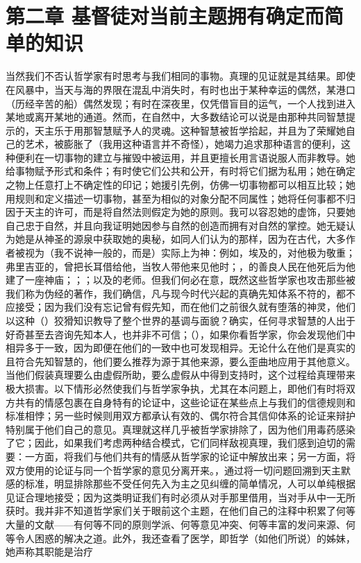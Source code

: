 
\section{第二章 基督徒对当前主题拥有确定而简单的知识}

当然我们不否认哲学家有时思考与我们相同的事物。真理的见证就是其结果。即使在风暴中，当天与海的界限在混乱中消失时，有时也出于某种幸运的偶然，某港口（历经辛苦的船）偶然发现；有时在深夜里，仅凭借盲目的运气，一个人找到进入某地或离开某地的通道。然而，在自然中，大多数结论可以说是由那种共同智慧提示的，天主乐于用那智慧赋予人的灵魂。这种智慧被哲学拾起，并且为了荣耀她自己的艺术，被膨胀了（我用这种语言并不奇怪），她竭力追求那种语言的便利，这种便利在一切事物的建立与摧毁中被运用，并且更擅长用言语说服人而非教导。她给事物赋予形式和条件；有时使它们公共和公开，有时将它们据为私用；她在确定之物上任意打上不确定性的印记；她援引先例，仿佛一切事物都可以相互比较；她用规则和定义描述一切事物，甚至为相似的对象分配不同属性；她将任何事都不归因于天主的许可，而是将自然法则假定为她的原则。我可以容忍她的虚饰，只要她自己忠于自然，并且向我证明她因参与自然的创造而拥有对自然的掌控。她无疑认为她是从神圣的源泉中获取她的奥秘，如同人们认为的那样，因为在古代，大多作者被视为（我不说神一般的，而是）实际上为神：例如，埃及的，对他极为敬重；弗里吉亚的，曾把长耳借给他，当牧人带他来见他时；，的善良人民在他死后为他建了一座神庙；；；以及的老师。但我们何必在意，既然这些哲学家也攻击那些被我们称为伪经的著作，我们确信，凡与现今时代兴起的真确先知体系不符的，都不应接受；因为我们没有忘记曾有假先知，而在他们之前很久就有堕落的神灵，他们以这种（）狡猾知识教导了整个世界的基调与面貌？确实，任何寻求智慧的人出于好奇甚至去咨询先知本人，也并非不可信；（），如果你看哲学家，你会发现他们中相异多于一致，因为即便在他们的一致中也可发现相异。无论什么在他们是真实的且符合先知智慧的，他们要么推荐为源于其他来源，要么歪曲地应用于其他意义。当他们假装真理要么由虚假所助，要么虚假从中得到支持时，这个过程给真理带来极大损害。以下情形必然使我们与哲学家争执，尤其在本问题上，即他们有时将双方共有的情感包裹在自身特有的论证中，这些论证在某些点上与我们的信德规则和标准相悖；另一些时候则用双方都承认有效的、偶尔符合其信仰体系的论证来辩护特别属于他们自己的意见。真理就这样几乎被哲学家排除了，因为他们用毒药感染了它；因此，如果我们考虑两种结合模式，它们同样敌视真理，我们感到迫切的需要：一方面，将我们与他们共有的情感从哲学家的论证中解放出来；另一方面，将双方使用的论证与同一个哲学家的意见分离开来。，通过将一切问题回溯到天主默感的标准，明显排除那些不受任何先入为主之见纠缠的简单情况，人可以单纯根据见证合理地接受；因为这类明证我们有时必须从对手那里借用，当对手从中一无所获时。我并非不知道哲学家们关于眼前这个主题，在他们自己的注释中积累了何等大量的文献——有何等不同的原则学派、何等意见冲突、何等丰富的发问来源、何等令人困惑的解决之道。此外，我还查看了医学，即哲学（如他们所说）的姊妹，她声称其职能是治疗